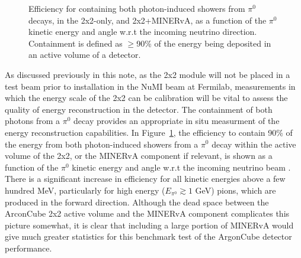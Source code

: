 \begin{figure}[htb]
  \centering
  \caption{Efficiency for containing both photon-induced showers from $\pi^{0}$ decays, in the 2x2-only, and 2x2+MINERvA, as a function of the $\pi^{0}$ kinetic energy and angle w.r.t the incoming neutrino direction. Containment is defined as $\geq$90\% of the energy being deposited in an active volume of a detector.}
  \label{fig:pi0_containment}
\end{figure}
As discussed previously in this note, as the 2x2 module will not be placed in a test beam prior to installation in the NuMI beam at Fermilab, measurements in which the energy scale of the 2x2 can be calibration will be vital to assess the quality of energy reconstruction in the detector. The containment of both photons from a $\pi^{0}$ decay provides an appropriate in situ measurment of the energy reconstruction capabilities. In Figure~\ref{fig:pi0_containment}, the efficiency to contain 90\% of the energy from both photon-induced showers from a $\pi^{0}$ decay within the active volume of the 2x2, or the MINERvA component if relevant, is shown as a function of the $\pi^{0}$ kinetic energy and angle w.r.t the incoming neutrino beam . There is a significant increase in efficiency for all kinetic energies above a few hundred MeV, particularly for high energy ($E_{\pi^{0}} \gtrsim 1$ GeV) pions, which are produced in the forward direction. Although the dead space between the ArconCube 2x2 active volume and the MINERvA component complicates this picture somewhat, it is clear that including a large portion of MINERvA would give much greater statistics for this benchmark test of the ArgonCube detector performance.


